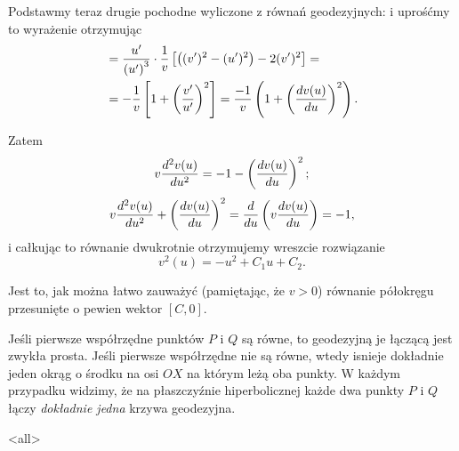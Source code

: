 \begin{frame}

Podstawmy teraz drugie pochodne wyliczone z równań geodezyjnych:
i uprośćmy to wyrażenie otrzymując
\begin{align*}
&=\frac{u'}{\left(u'\right)^3}\cdot\frac{1}{v}\left[\left((v')^2-(u')^2\right)-2(v')^2\right]=\\
&=-\frac{1}{v}\left[1+\left(\frac{v'}{u'}\right)^2\right]=\frac{-1}{v}\left(1+\left(\frac{dv(u)}{du}\right)^2\right).
\end{align*}

\end{frame}
\begin{frame}

Zatem \[v\frac{d^2v(u)}{du^2}=-1-\left(\frac{dv(u)}{du}\right)^2;\]\pause
\[v\frac{d^2v(u)}{du^2}+\left(\frac{dv(u)}{du}\right)^2=\frac{d}{du}\left(v\frac{dv(u)}{du}\right)=-1,\]
i całkując to równanie dwukrotnie otrzymujemy wreszcie rozwiązanie
\[v^2(u)=-u^2+C_1u+C_2.\]

\pause Jest to, jak można łatwo zauważyć (pamiętając, że $v>0$) równanie półokręgu przesunięte o pewien wektor $[C,0]$.

\end{frame}
\begin{frame}
\begin{uwaga}
Jeśli pierwsze współrzędne punktów $P$ i $Q$ są równe, to geodezyjną je łączącą jest zwykła prosta. Jeśli pierwsze współrzędne nie są równe, wtedy isnieje dokładnie jeden okrąg o środku na osi $OX$ na którym leżą oba punkty. \pause W każdym przypadku widzimy, że na płaszczyźnie hiperbolicznej każde dwa punkty $P$ i $Q$ łączy \textit{dokładnie jedna} krzywa geodezyjna. 
\end{uwaga}

\end{frame}
\mode<all>{}
